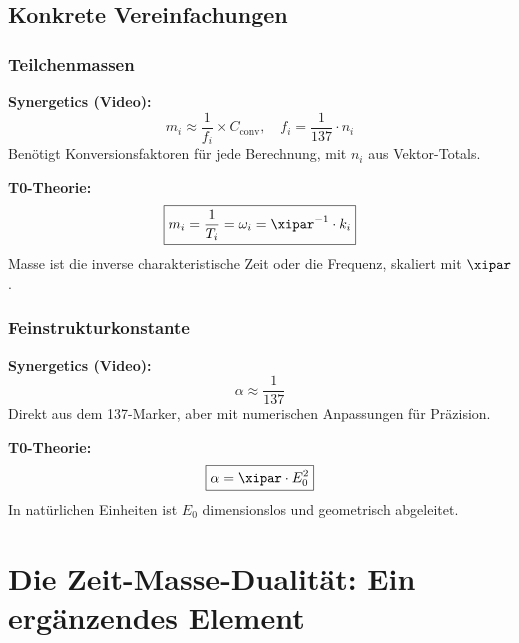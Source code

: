 	\subsection{Konkrete Vereinfachungen}
	
	\subsubsection{Teilchenmassen}
	
	\textbf{Synergetics (Video):}
	\begin{equation}
		m_i \approx \frac{1}{f_i} \times C_{\text{conv}}, \quad f_i = \frac{1}{137} \cdot n_i
	\end{equation}
	Benötigt Konversionsfaktoren für jede Berechnung, mit $n_i$ aus Vektor-Totals.
	
	\textbf{T0-Theorie:}
	\begin{equation}
		\boxed{m_i = \frac{1}{T_i} = \omega_i = \xipar^{-1} \cdot k_i}
	\end{equation}
	Masse ist die inverse charakteristische Zeit oder die Frequenz, skaliert mit $\xipar$.
	
	\subsubsection{Feinstrukturkonstante}
	
	\textbf{Synergetics (Video):}
	\begin{equation}
		\alpha \approx \frac{1}{137}
	\end{equation}
	Direkt aus dem 137-Marker, aber mit numerischen Anpassungen für Präzision.
	
	\textbf{T0-Theorie:}
	\begin{equation}
		\boxed{\alpha = \xipar \cdot E_0^2}
	\end{equation}
	In natürlichen Einheiten ist $E_0$ dimensionslos und geometrisch abgeleitet.
	
	\section{Die Zeit-Masse-Dualität: Ein ergänzendes Element}
	
